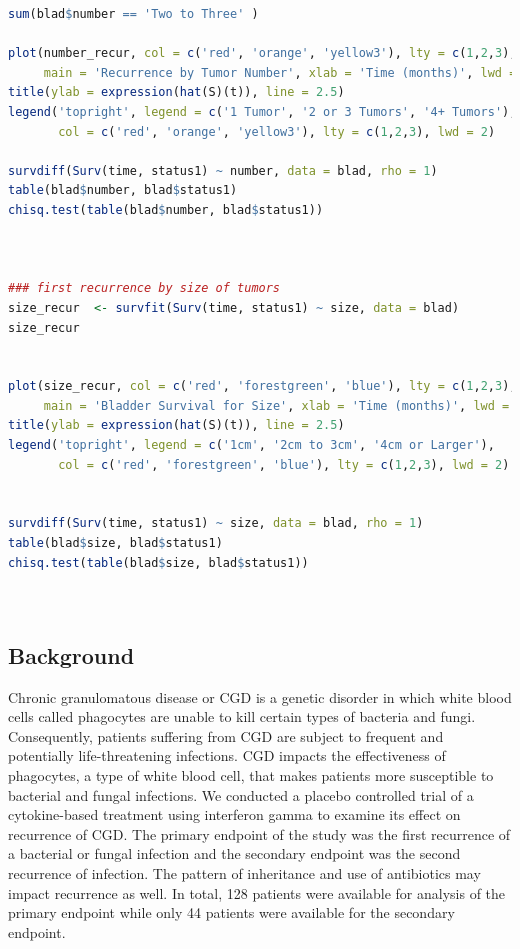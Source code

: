 \documentclass{article}
\begin{document}
\begin{lstlisting}[language=R,caption={Case 1: Bladder Cancer Survival Analysis},label={lst:case1}]
sum(blad$number == 'Two to Three' )

plot(number_recur, col = c('red', 'orange', 'yellow3'), lty = c(1,2,3), 
     main = 'Recurrence by Tumor Number', xlab = 'Time (months)', lwd = 2)
title(ylab = expression(hat(S)(t)), line = 2.5)
legend('topright', legend = c('1 Tumor', '2 or 3 Tumors', '4+ Tumors'), 
       col = c('red', 'orange', 'yellow3'), lty = c(1,2,3), lwd = 2)

survdiff(Surv(time, status1) ~ number, data = blad, rho = 1)
table(blad$number, blad$status1)
chisq.test(table(blad$number, blad$status1))



### first recurrence by size of tumors 
size_recur  <- survfit(Surv(time, status1) ~ size, data = blad)
size_recur 


plot(size_recur, col = c('red', 'forestgreen', 'blue'), lty = c(1,2,3), 
     main = 'Bladder Survival for Size', xlab = 'Time (months)', lwd = 2)
title(ylab = expression(hat(S)(t)), line = 2.5)
legend('topright', legend = c('1cm', '2cm to 3cm', '4cm or Larger'), 
       col = c('red', 'forestgreen', 'blue'), lty = c(1,2,3), lwd = 2)


survdiff(Surv(time, status1) ~ size, data = blad, rho = 1)
table(blad$size, blad$status1)
chisq.test(table(blad$size, blad$status1))




	\end{lstlisting}

	\newpage
	\setcounter{table}{0}
	\setcounter{figure}{0}

	\subsection*{Background}
	Chronic granulomatous disease or CGD is a genetic disorder in which white blood cells called phagocytes are unable to kill certain types of bacteria and fungi. Consequently, patients suffering from CGD are subject to frequent and potentially life-threatening infections. CGD impacts the effectiveness of phagocytes, a type of white blood cell, that makes patients more susceptible to bacterial and fungal infections. We conducted a placebo controlled trial of a cytokine-based treatment using interferon gamma to examine its effect on recurrence of CGD. The primary endpoint of the study was the first recurrence of a bacterial or fungal infection and the secondary endpoint was the second recurrence of infection. The pattern of inheritance and use of antibiotics may impact recurrence as well. In total, 128 patients were available for analysis of the primary endpoint while only 44 patients were available for the secondary endpoint.
\end{document}
